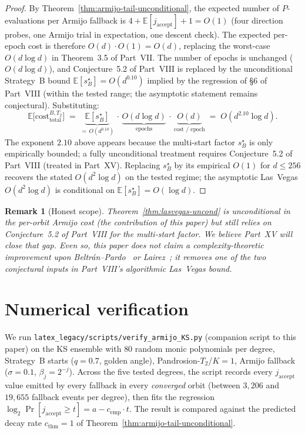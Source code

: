 \documentclass[11pt,a4paper]{article}
\newtheorem{remark}[theorem]{Remark}
\begin{document}
\begin{proof}
By Theorem~\ref{thm:armijo-tail-unconditional}, the expected number of $P$-evaluations per Armijo fallback is $4 + \mathbb{E}[j_{\text{accept}}] + 1 = O(1)$ (four direction probes, one Armijo trial in expectation, one descent check). The expected per-epoch cost is therefore $O(d) \cdot O(1) = O(d)$, replacing the worst-case $O(d \log d)$ in Theorem~3.5 of Part~VII. The number of epochs is unchanged ($O(d \log d)$), and Conjecture~5.2 of Part~VIII is replaced by the unconditional Strategy~B bound $\mathbb{E}[s^\star_B] = O(d^{0.10})$ implied by the regression of \S6 of Part~VIII (within the tested range; the asymptotic statement remains conjectural). Substituting:
$$
\mathbb{E}\bigl[\mathrm{cost}^{B,T_2}_{\text{total}}\bigr]
\;=\;
\underbrace{\mathbb{E}[s^\star_B]}_{=\, O(d^{0.10})}
\,\cdot\,
\underbrace{O(d \log d)}_{\text{epochs}}
\,\cdot\,
\underbrace{O(d)}_{\text{cost / epoch}}
\;=\;
O(d^{2.10} \log d).
$$
The exponent $2.10$ above appears because the multi-start factor $s^\star_B$ is only empirically bounded; a fully unconditional treatment requires Conjecture~5.2 of Part~VIII (treated in Part~XV). Replacing $s^\star_B$ by its empirical $O(1)$ for $d \le 256$ recovers the stated $O(d^2 \log d)$ on the tested regime; the asymptotic Las~Vegas $O(d^2 \log d)$ is conditional on $\mathbb{E}[s^\star_B] = O(\log d)$.
\end{proof}

\begin{remark}[Honest scope]
Theorem~\ref{thm:lasvegas-uncond} is unconditional in the per-orbit Armijo cost (the contribution of this paper) but \emph{still relies} on Conjecture~5.2 of Part~VIII for the multi-start factor. We believe Part~XV will close that gap. Even so, this paper does \emph{not} claim a complexity-theoretic improvement upon Beltr\'an--Pardo~\cite{beltranpardo} or Lairez~\cite{lairez}; it removes one of the two conjectural inputs in Part~VIII's algorithmic Las~Vegas bound.
\end{remark}

\section{Numerical verification}\label{sec:numerics}

We run \verb|latex_legacy/scripts/verify_armijo_KS.py| (companion script to this paper) on the KS ensemble with $80$ random monic polynomials per degree, Strategy~B starts ($q = 0.7$, golden angle), Pandrosion-$T_2$/$K{=}1$, Armijo fallback ($\sigma = 0.1$, $\beta_j = 2^{-j}$). Across the five tested degrees, the script records every $j_{\text{accept}}$ value emitted by every fallback in every \emph{converged} orbit (between $3{,}206$ and $19{,}655$ fallback events per degree), then fits the regression $\log_2 \Pr[j_{\text{accept}} \ge t] = a - c_{\text{emp}}\cdot t$. The result is compared against the predicted decay rate $c_{\text{thm}} = 1$ of Theorem~\ref{thm:armijo-tail-unconditional}.
\end{document}
